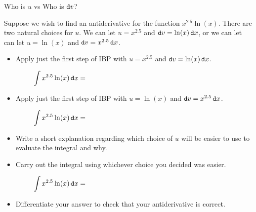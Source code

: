\begin{exercise}{Who is $u$ vs Who is $\mathop{}\!\mathtt{d} v$? \Coffeecup \Coffeecup}

Suppose we wish to find an antiderivative for the function $x^{2.5}\ln(x)$.  There are two natural choices for $u$.  We can let $u=x^{2.5}$ and $\mathop{}\!\mathtt{d} v=\ln(x)\mathop{}\!\mathtt{d} x$, or we can let can let $u=\ln(x)$ and $\mathop{}\!\mathtt{d} v=x^{2.5}\mathop{}\!\mathtt{d} x$.

\begin{itemize}
\item Apply just the first step of IBP with $u=x^{2.5}$ and $\mathop{}\!\mathtt{d} v=\ln(x)\mathop{}\!\mathtt{d} x$.

$$\int x^{2.5}\ln(x) \dif x = \hspace{3in}$$

\item Apply just the first step of IBP with $u=\ln(x)$ and $\mathop{}\!\mathtt{d} v=x^{2.5}\mathop{}\!\mathtt{d} x$.

$$\int x^{2.5}\ln(x) \dif x = \hspace{3in}$$

\item Write a short explanation regarding which choice of $u$ will be easier to use to evaluate the integral and why.

\item Carry out the integral using whichever choice you decided was easier.

$$\int x^{2.5}\ln(x) \dif x = \hspace{3in}$$

\item Differentiate your answer to check that your antiderivative is correct.

\end{itemize}
\end{exercise}